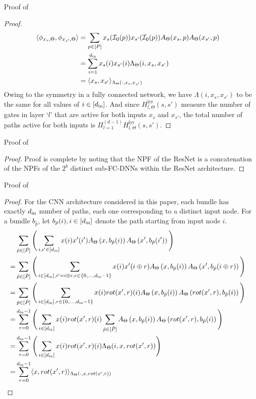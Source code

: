 \begin{appendix}
Proof of 
\begin{proof}
\begin{align}
\langle \phi_{x_s,\Theta},\phi_{x_{s'},\Theta}\rangle&=\sum_{p\in[P]}x_s(\mathcal{I}_0(p))x_{s'}(\mathcal{I}_0(p))A_{\Theta}(x_s,p)A_{\Theta}(x_{s'},p)\nonumber\\
&=\sum_{i=1}^{d_{\text{in}}}x_s(i)x_{s'}(i)\Lambda_{\Theta}(i,x_s,x_{s'})\nonumber\\
&=\langle x_s,x_{s'}\rangle_{\Lambda_{\Theta}(\cdot,x_s,x_{s'})}
\end{align}
Owing to the symmetry in a fully connected network, we have $\Lambda(i,x_s,x_{s'})$ to be the same for all values of $i\in[d_{\text{in}}]$. And since $H^{\text{lyr}}_{l,\Theta}(s,s')$ measure the number of gates in layer `$l$' that are active for both inputs $x_s$ and $x_{s'}$, the total number of paths active for both inputs is $\Pi_{l=1}^{(d-1)} H^{\text{lyr}}_{l,\Theta}(s,s')$.
\end{proof}

Proof of 
\begin{proof}
Proof is complete by noting that the NPF of the ResNet is a concatenation of the NPFs of the $2^b$ distinct sub-FC-DNNs within the ResNet architecture.
\end{proof}


Proof of 
\begin{proof}
For the CNN architecture considered in this paper, each bundle has exactly $d_{\text{in}}$ number of paths, each one corresponding to a distinct input node. For a bundle $b_{\hat{p}}$, let $b_{\hat{p}}(i),i\in[d_{\text{in}}]$ denote the path starting from input node $i$.
\begin{align*}
&\sum_{\hat{p}\in [\hat{P}]} \Bigg(\sum_{i,i'\in[d_{\text{in}}]} x(i) x'(i') A_{\Theta}\left(x,b_{\hat{p}}(i)\right) A_{\Theta}\left(x',b_{\hat{p}}(i')\right) \Bigg)\\
=&\sum_{\hat{p}\in [\hat{P}]}\Bigg(\sum_{i\in[d_{\text{in}}],i'=i\oplus r, r\in\{0,\ldots,d_{\text{in}}-1\}} x(i) x'(i\oplus r) A_{\Theta}\left(x,b_{\hat{p}}(i)\right) A_{\Theta}\left(x',b_{\hat{p}}(i\oplus r)\right)\Bigg)\\
=&\sum_{\hat{p}\in [\hat{P}]}\Bigg(\sum_{i\in[d_{\text{in}}], r\in\{0,\ldots,d_{\text{in}}-1\}} x(i) rot(x',r)(i) A_{\Theta}\left(x,b_{\hat{p}}(i)\right) A_{\Theta}\left(rot(x',r),b_{\hat{p}}(i)\right)\Bigg)\\
=&\sum_{r=0}^{d_{\text{in}}-1} \Bigg(\sum_{i\in[d_{\text{in}}]} x(i) rot(x',r)(i) \sum_{\hat{p}\in [\hat{P}]}  A_{\Theta}\left(x,b_{\hat{p}}(i)\right) A_{\Theta}\left(rot(x',r),b_{\hat{p}}(i)\right)\Bigg)\\
=&\sum_{r=0}^{d_{\text{in}}-1}\Bigg(\sum_{i\in[d_{\text{in}}]} x(i) rot(x',r)(i) \Lambda_{\Theta}(i,x,rot(x',r))\Bigg)\\
=&\sum_{r=0}^{d_{\text{in}}-1} \langle x,rot(x',r)\rangle_{\Lambda_{\Theta}(\cdot,x,rot(x',r))}
\end{align*}
\end{proof}


\end{appendix}

